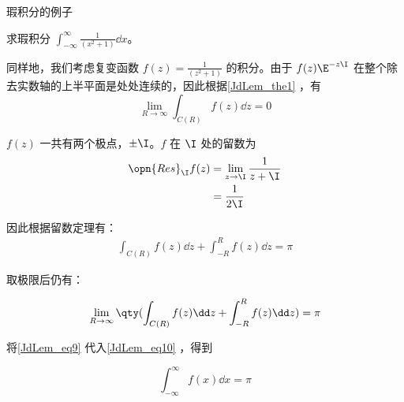 \begin{example}{瑕积分的例子}

求瑕积分 $\int_{-\infty}^\infty \frac{1}{(x^2+1)}\dd x$。

同样地，我们考虑复变函数 $f(z)=\frac{1}{(z^2+1)}$ 的积分。由于 $f(z)\E^{-z\I}$ 在整个除去实数轴的上半平面是处处连续的，因此根据\autoref{JdLem_the1} ，有
\begin{equation}\label{JdLem_eq9}
\lim\limits_{R\to \infty}\int_{C(R)}f(z)\dd z=0
\end{equation}

$f(z)$ 一共有两个极点，$\pm\I$。$f$ 在 $\I$ 处的留数为
\begin{equation}
\begin{aligned}
\opn{Res}_\I f(z)&=\lim\limits_{z\to\I}\frac{1}{z+\I}\\
&=\frac{1}{2\I}
\end{aligned}
\end{equation}

因此根据留数定理有：
\begin{equation}\label{JdLem_eq8}
\begin{aligned}
\int_{C(R)}f(z)\dd z+\int_{-R}^R f(z)\dd z=\pi
\end{aligned}
\end{equation}

取极限后仍有：

\begin{equation}\label{JdLem_eq10}
\begin{aligned}
\lim\limits_{R\to \infty}\qty(\int_{C(R)}f(z)\dd z+\int_{-R}^R f(z)\dd z)=\pi
\end{aligned}
\end{equation}

将\autoref{JdLem_eq9} 代入\autoref{JdLem_eq10} ，得到

\begin{equation}
\int^\infty_{-\infty} f(x)\dd x=\pi
\end{equation}



\end{example}





























